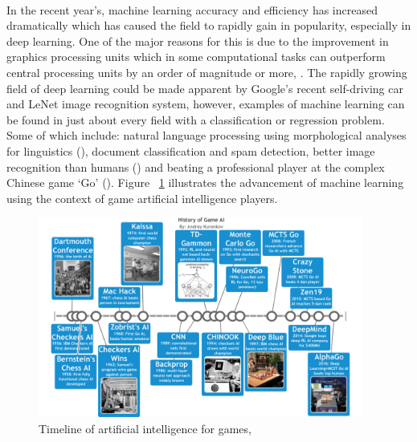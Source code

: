 \paragraph{}In the recent year’s, machine learning accuracy and efficiency has increased dramatically which has caused the field to rapidly gain in popularity, especially in deep learning. One of the major reasons for this is due to the improvement in graphics processing units which in some computational tasks can outperform central processing units by an order of magnitude or more, \cite{CNNperf}. The rapidly growing field of deep learning could be made apparent by Google’s recent self-driving car and LeNet image recognition system, however, examples of machine learning can be found in just about every field with a classification or regression problem. Some of which include: natural language processing using morphological analyses for linguistics (\cite{NLP}), document classification and spam detection, better image recognition than humans (\cite{manualclassifying}) and beating a professional player at the complex Chinese game ‘Go’ (\cite{Gobot}). Figure ~\ref{fig:aitimeline} illustrates the advancement of machine learning using the context of game artificial intelligence players.

\begin{figure} 
   \centering
   \includegraphics[width=0.95\textwidth]{Figures/aitimeline.png}
   \caption[Timeline of artificial intelligence for games]{ Timeline of artificial intelligence for games, ~\cite{timeline}}
   \label{fig:aitimeline}
\end{figure}


